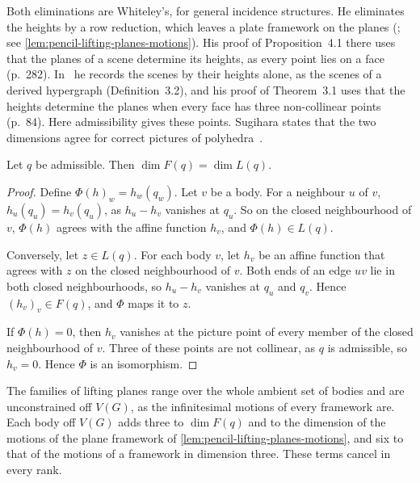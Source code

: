 Both eliminations are Whiteley's, for general incidence structures. He
eliminates the heights by a row reduction, which leaves a plate
framework on the planes (\cite[\S 4.1]{whiteley1984}; see
\cref{lem:pencil-lifting-planes-motions}). His proof of
Proposition~4.1 there uses that the planes of a scene determine its
heights, as every point lies on a face (p.~282).
In~\cite[\S\S 2--3]{whiteley1989} he records the scenes by their heights
alone, as the scenes of a derived hypergraph (Definition~3.2), and his
proof of Theorem~3.1 uses that the heights determine the planes when
every face has three non-collinear points (p.~84). Here admissibility
gives these points. Sugihara states that the two
dimensions agree for correct pictures of
polyhedra~\cite[p.~84]{sugihara1984}.

\begin{lemma}
  \label{lem:pencil-lifting-planes-dim}
  \leanok
  Let $q$ be admissible. Then $\dim F(q) = \dim L(q)$.
\end{lemma}
\begin{proof}
  \leanok
  Define $\Phi(h)_w = h_w(q_w)$. Let $v$ be a body. For a neighbour $u$
  of $v$, $h_u(q_u) = h_v(q_u)$, as $h_u - h_v$ vanishes at $q_u$. So on
  the closed neighbourhood of $v$, $\Phi(h)$ agrees with the affine
  function $h_v$, and $\Phi(h) \in L(q)$.

  Conversely, let $z \in L(q)$. For each body $v$, let $h_v$ be an affine
  function that agrees with $z$ on the closed neighbourhood of $v$. Both
  ends of an edge $uv$ lie in both closed neighbourhoods, so $h_u - h_v$
  vanishes at $q_u$ and $q_v$. Hence $(h_v)_v \in F(q)$, and $\Phi$ maps
  it to $z$.

  If $\Phi(h) = 0$, then $h_v$ vanishes at the picture point of every
  member of the closed neighbourhood of $v$. Three of these points are
  not collinear, as $q$ is admissible, so $h_v = 0$. Hence $\Phi$ is an
  isomorphism.
\end{proof}

\begin{fmlnote}
  \label{fmlnote:pencil-lifting-planes}
  The families of lifting planes range over the whole ambient set of
  bodies and are unconstrained off $V(G)$, as the infinitesimal motions
  of every framework are. Each body off $V(G)$ adds three to
  $\dim F(q)$ and to the dimension of the motions of the plane framework
  of \cref{lem:pencil-lifting-planes-motions}, and six to that of the
  motions of a framework in dimension three. These terms cancel in every
  rank.
\end{fmlnote}

